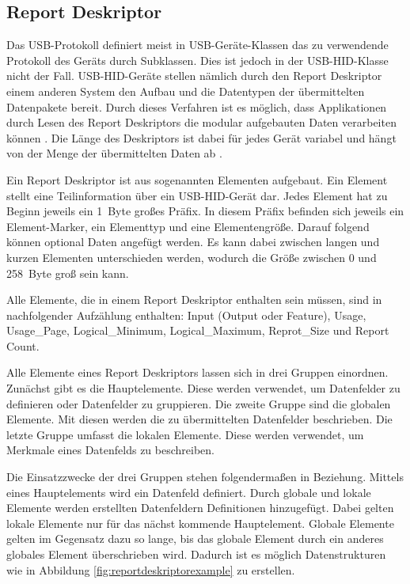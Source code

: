 \subsection{Report Deskriptor}

Das USB-Protokoll definiert meist in USB-Geräte-Klassen das zu verwendende Protokoll des Geräts durch Subklassen. Dies ist jedoch in der USB-\acs{HID}-Klasse nicht der Fall. USB-\acs{HID}-Geräte stellen nämlich durch den Report Deskriptor einem anderen System den Aufbau und die Datentypen der übermittelten Datenpakete bereit. \cite[S.~8]{usbHIDS} Durch dieses Verfahren ist es möglich, dass Applikationen durch Lesen des Report Deskriptors die modular aufgebauten Daten verarbeiten können \cite[S.~24]{usbHIDS}. Die Länge des Deskriptors ist dabei für jedes Gerät variabel und hängt von der Menge der übermittelten Daten ab \cite[S.~23]{usbHIDS}.

Ein Report Deskriptor ist aus sogenannten Elementen aufgebaut. Ein Element stellt eine Teilinformation über ein USB-\acs{HID}-Gerät dar. Jedes Element hat zu Beginn jeweils ein 1~Byte großes Präfix. In diesem Präfix befinden sich jeweils ein Element-Marker, ein Elementtyp und eine Elementengröße. Darauf folgend können optional Daten angefügt werden. Es kann dabei zwischen langen und kurzen Elementen unterschieden werden, wodurch die Größe zwischen 0 und 258~Byte groß sein kann. \cite[S.~14]{usbHIDS}

Alle Elemente, die in einem Report Deskriptor enthalten sein müssen, sind in nachfolgender Aufzählung enthalten: Input (Output oder Feature), Usage, Usage\_Page, Logical\_Minimum, Logical\_Maximum, Reprot\_Size und Report Count. \cite[S.~24]{usbHIDS}

Alle Elemente eines Report Deskriptors lassen sich in drei Gruppen einordnen. Zunächst gibt es die Hauptelemente. Diese werden verwendet, um Datenfelder zu definieren oder Datenfelder zu gruppieren. Die zweite Gruppe sind die globalen Elemente. Mit diesen werden die zu übermittelten Datenfelder beschrieben. Die letzte Gruppe umfasst die lokalen Elemente. Diese werden verwendet, um Merkmale eines Datenfelds zu beschreiben. \cite[S.~16, S.~28, S.~35]{usbHIDS}

Die Einsatzzwecke der drei Gruppen stehen folgendermaßen in Beziehung. Mittels eines Hauptelements wird ein Datenfeld definiert. Durch globale und lokale Elemente werden erstellten Datenfeldern Definitionen hinzugefügt. Dabei gelten lokale Elemente nur für das nächst kommende Hauptelement. Globale Elemente gelten im Gegensatz dazu so lange, bis das globale Element durch ein anderes globales Element überschrieben wird. Dadurch ist es möglich Datenstrukturen wie in Abbildung \ref{fig:reportdeskriptorexample} zu erstellen. \cite[S.~24]{usbHIDS}


